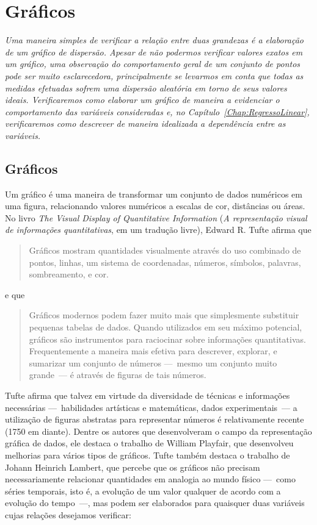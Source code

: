 \chapter{Gráficos}
\label{Chap:Graficos}

\begin{fullwidth}
{\it
Uma maneira simples de verificar a relação entre duas grandezas é a elaboração de um gráfico de dispersão. Apesar de não podermos verificar valores exatos em um gráfico, uma observação do comportamento geral de um conjunto de pontos pode ser muito esclarecedora, principalmente se levarmos em conta que todas as medidas efetuadas sofrem uma dispersão aleatória em torno de seus valores ideais. Verificaremos como elaborar um gráfico de maneira a evidenciar o comportamento das variáveis consideradas e, no Capítulo~\ref{Chap:RegressoLinear}, verificaremos como descrever de maneira idealizada a dependência entre as variáveis.
}
\end{fullwidth}

\section{Gráficos}

Um gráfico é uma maneira de transformar um conjunto de dados numéricos em uma figura, relacionando valores numéricos a escalas de cor, distâncias ou áreas. No livro \emph{The Visual Display of Quantitative Information}\cite{Tufte2001} (\emph{A representação visual de informações quantitativas}, em um tradução livre), Edward R. Tufte
afirma que
\begin{quote}
	Gráficos mostram quantidades visualmente através do uso combinado de pontos, linhas, um sistema de coordenadas, números, símbolos, palavras, sombreamento, e cor.
\end{quote}
%
e que
\begin{quote}
	Gráficos modernos podem fazer muito mais que simplesmente substituir pequenas tabelas de dados. Quando utilizados em seu máximo potencial, gráficos são instrumentos para raciocinar sobre informações quantitativas. Frequentemente a maneira mais efetiva para descrever, explorar, e sumarizar um conjunto de números ---~mesmo um conjunto muito grande~--- é através de figuras de tais números.
\end{quote}

Tufte afirma que talvez em virtude da diversidade de técnicas e informações necessárias ---~habilidades artísticas e matemáticas, dados experimentais~--- a utilização de figuras abstratas para representar números é relativamente recente (1750 em diante). Dentre os autores que desenvolveram o campo da representação gráfica de dados, ele destaca o trabalho de William Playfair, que desenvolveu melhorias para vários tipos de gráficos. Tufte também destaca o trabalho de Johann Heinrich Lambert, que percebe que os gráficos não precisam necessariamente relacionar quantidades em analogia ao mundo físico ---~como séries temporais, isto é, a evolução de um valor qualquer de acordo com a evolução do tempo~---, mas podem ser elaborados para quaisquer duas variáveis cujas relações desejamos verificar:

